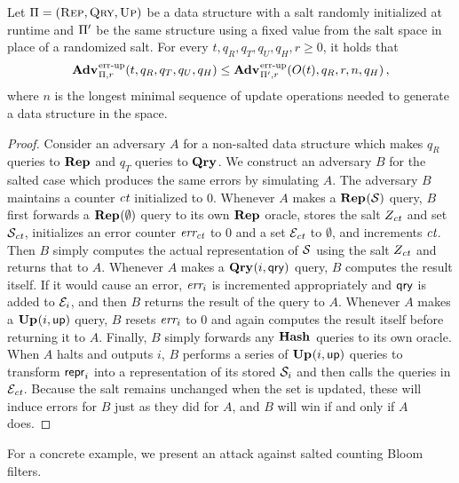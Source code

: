 \begin{lemma}\label{lemma:nosalt}
  Let $\mathrm{\Pi} = (\textsc{Rep}, \textsc{Qry}, \textsc{Up})$ be a data structure with a salt randomly initialized at runtime and $\mathrm{\Pi}'$ be the same structure using a fixed value from the salt space in place of a randomized salt. For every $t, q_R, q_T, q_U, q_H, r\geq 0$, it holds that
  \[
    \Adv{\errep}_{\struct,r}(t, q_R, q_T, q_U, q_H) \leq
    \Adv{\errep}_{\struct',r}(O(t), q_R, r, n, q_H) \,,
  \]
  where $n$ is the longest minimal sequence of update operations needed to generate a data structure in the space.
\end{lemma}
\begin{proof}
Consider an adversary $A$ for a non-salted data structure which makes $q_R$ queries to $\mathbf{Rep}\hspace{0.5pt}$ and $q_T$ queries to $\mathbf{Qry}\hspace{0.5pt}$. We construct an adversary $B$ for the salted case which produces the same errors by simulating $A$. The adversary $B$ maintains a counter $\textit{ct}$ initialized to 0. Whenever $A$ makes a $\mathbf{Rep}\hspace{0.5pt}(\mathcal{S})$ query, $B$ first forwards a $\mathbf{Rep}\hspace{0.5pt}(\emptyset)$ query to its own $\mathbf{Rep}\hspace{0.5pt}$ oracle, stores the salt $Z_{\textit{ct}}$ and set $\mathcal{S}_{\textit{ct}}$, initializes an error counter $\textit{err}_{\textit{ct}}$ to 0 and a set $\mathcal{E}_{\textit{ct}}$ to $\emptyset$, and increments $\textit{ct}$. Then $B$ simply computes the actual representation of $\mathcal{S}$ using the salt $Z_{\textit{ct}}$ and returns that to $A$. Whenever $A$ makes a $\mathbf{Qry}\hspace{0.5pt}(i,\mathsf{qry})$ query, $B$ computes the result itself. If it would cause an error, $\textit{err}_i$ is incremented appropriately and $\mathsf{qry}$ is added to $\mathcal{E}_i$, and then $B$ returns the result of the query to $A$. Whenever $A$ makes a $\mathbf{Up}\hspace{0.5pt}(i, \mathsf{up})$ query, $B$ resets $\textit{err}_i$ to 0 and again computes the result itself before returning it to $A$. Finally, $B$ simply forwards any $\mathbf{Hash}\hspace{0.5pt}$ queries to its own oracle. When $A$ halts and outputs $i$, $B$ performs a series of $\mathbf{Up}\hspace{0.5pt}(i, \mathsf{up})$ queries to transform $\mathsf{repr}_i$ into a representation of its stored $\mathcal{S}_i$ and then calls the queries in $\mathcal{E}_{\textit{ct}}$. Because the salt remains unchanged when the set is updated, these will induce errors for $B$ just as they did for $A$, and $B$ will win if and only if $A$ does. \missingqed
\end{proof}

For a concrete example, we present an attack against salted counting Bloom filters. 


